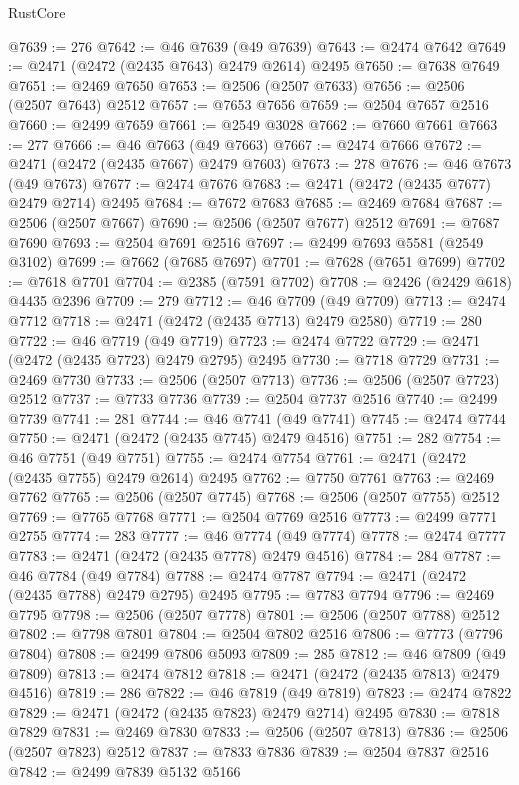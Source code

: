 \begin{lexlean}{RustCore}
\begin{coremodule}
@7639 := 276
@7642 := @46 @7639 (@49 @7639)
@7643 := @2474 @7642
@7649 := @2471 (@2472 (@2435 @7643) @2479 @2614) @2495
@7650 := @7638 @7649
@7651 := @2469 @7650
@7653 := @2506 (@2507 @7633)
@7656 := @2506 (@2507 @7643) @2512
@7657 := @7653 @7656
@7659 := @2504 @7657 @2516
@7660 := @2499 @7659
@7661 := @2549 @3028
@7662 := @7660 @7661
@7663 := 277
@7666 := @46 @7663 (@49 @7663)
@7667 := @2474 @7666
@7672 := @2471 (@2472 (@2435 @7667) @2479 @7603)
@7673 := 278
@7676 := @46 @7673 (@49 @7673)
@7677 := @2474 @7676
@7683 := @2471 (@2472 (@2435 @7677) @2479 @2714) @2495
@7684 := @7672 @7683
@7685 := @2469 @7684
@7687 := @2506 (@2507 @7667)
@7690 := @2506 (@2507 @7677) @2512
@7691 := @7687 @7690
@7693 := @2504 @7691 @2516
@7697 := @2499 @7693 @5581 (@2549 @3102)
@7699 := @7662 (@7685 @7697)
@7701 := @7628 (@7651 @7699)
@7702 := @7618 @7701
@7704 := @2385 (@7591 @7702)
@7708 := @2426 (@2429 @618) @4435 @2396
@7709 := 279
@7712 := @46 @7709 (@49 @7709)
@7713 := @2474 @7712
@7718 := @2471 (@2472 (@2435 @7713) @2479 @2580)
@7719 := 280
@7722 := @46 @7719 (@49 @7719)
@7723 := @2474 @7722
@7729 := @2471 (@2472 (@2435 @7723) @2479 @2795) @2495
@7730 := @7718 @7729
@7731 := @2469 @7730
@7733 := @2506 (@2507 @7713)
@7736 := @2506 (@2507 @7723) @2512
@7737 := @7733 @7736
@7739 := @2504 @7737 @2516
@7740 := @2499 @7739
@7741 := 281
@7744 := @46 @7741 (@49 @7741)
@7745 := @2474 @7744
@7750 := @2471 (@2472 (@2435 @7745) @2479 @4516)
@7751 := 282
@7754 := @46 @7751 (@49 @7751)
@7755 := @2474 @7754
@7761 := @2471 (@2472 (@2435 @7755) @2479 @2614) @2495
@7762 := @7750 @7761
@7763 := @2469 @7762
@7765 := @2506 (@2507 @7745)
@7768 := @2506 (@2507 @7755) @2512
@7769 := @7765 @7768
@7771 := @2504 @7769 @2516
@7773 := @2499 @7771 @2755
@7774 := 283
@7777 := @46 @7774 (@49 @7774)
@7778 := @2474 @7777
@7783 := @2471 (@2472 (@2435 @7778) @2479 @4516)
@7784 := 284
@7787 := @46 @7784 (@49 @7784)
@7788 := @2474 @7787
@7794 := @2471 (@2472 (@2435 @7788) @2479 @2795) @2495
@7795 := @7783 @7794
@7796 := @2469 @7795
@7798 := @2506 (@2507 @7778)
@7801 := @2506 (@2507 @7788) @2512
@7802 := @7798 @7801
@7804 := @2504 @7802 @2516
@7806 := @7773 (@7796 @7804)
@7808 := @2499 @7806 @5093
@7809 := 285
@7812 := @46 @7809 (@49 @7809)
@7813 := @2474 @7812
@7818 := @2471 (@2472 (@2435 @7813) @2479 @4516)
@7819 := 286
@7822 := @46 @7819 (@49 @7819)
@7823 := @2474 @7822
@7829 := @2471 (@2472 (@2435 @7823) @2479 @2714) @2495
@7830 := @7818 @7829
@7831 := @2469 @7830
@7833 := @2506 (@2507 @7813)
@7836 := @2506 (@2507 @7823) @2512
@7837 := @7833 @7836
@7839 := @2504 @7837 @2516
@7842 := @2499 @7839 @5132 @5166

\end{coremodule}
\end{lexlean}
